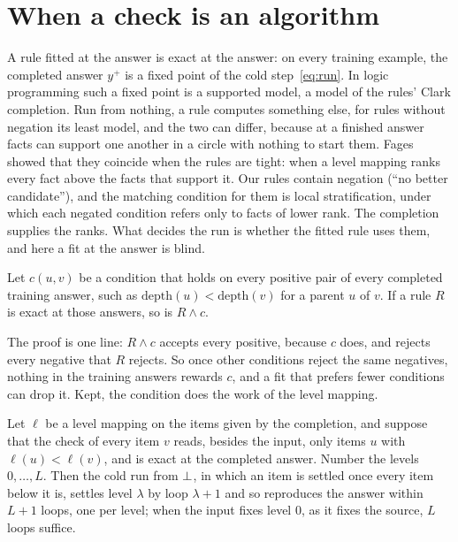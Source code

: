 \section{When a check is an algorithm}\label{sec:theory}

A rule fitted at the answer is exact at the answer: on every training example, the completed answer $y^{+}$ is a fixed
point of the cold step~\eqref{eq:run}. In logic programming such a fixed point is a supported model, a model of the
rules' Clark completion\cite{clark1978negation}. Run from nothing, a rule computes something else, for rules without
negation its least model, and the two can differ, because at a finished answer facts can support one another in a
circle with nothing to start them. Fages showed that they coincide when the rules are tight: when a level mapping ranks
every fact above the facts that support it\cite{fages1994consistency}. Our rules contain negation (``no better
candidate''), and the matching condition for them is local stratification, under which each negated condition refers
only to facts of lower rank\cite{apt1988towards}. The completion supplies the ranks. What decides the run is whether the
fitted rule uses them, and here a fit at the answer is blind.

\begin{proposition}\label{prop:invisible}
Let $c(u,v)$ be a condition that holds on every positive pair of every completed training answer, such as
$\mathrm{depth}(u) < \mathrm{depth}(v)$ for a parent $u$ of $v$. If a rule $R$ is exact at those answers, so is
$R \wedge c$.
\end{proposition}

The proof is one line: $R \wedge c$ accepts every positive, because $c$ does, and rejects every negative that $R$
rejects. So once other conditions reject the same negatives, nothing in the training answers rewards $c$, and a fit that
prefers fewer conditions can drop it. Kept, the condition does the work of the level mapping.

\begin{proposition}\label{prop:stratified}
Let $\ell$ be a level mapping on the items given by the completion, and suppose that the check of every item $v$ reads,
besides the input, only items $u$ with $\ell(u) < \ell(v)$, and is exact at the completed answer. Number the levels
$0,\ldots,L$. Then the cold run from $\bot$, in which an item is settled once every item below it is, settles level
$\lambda$ by loop $\lambda+1$ and so reproduces the answer within $L+1$ loops, one per level; when the input fixes level
$0$, as it fixes the source, $L$ loops suffice.
\end{proposition}

